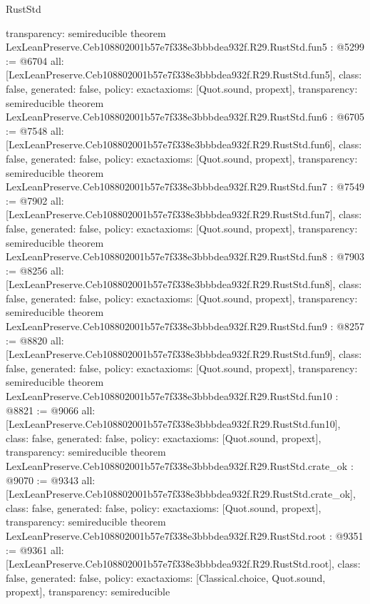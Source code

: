 \begin{lexlean}{RustStd}
\begin{coremodule}
{  transparency: semireducible
}
theorem LexLeanPreserve.Ceb108802001b57e7f338e3bbbdea932f.R29.RustStd.fun5 : @5299 := @6704 {
  all: [LexLeanPreserve.Ceb108802001b57e7f338e3bbbdea932f.R29.RustStd.fun5],
  class: false,
  generated: false,
  policy: exact{axioms: [Quot.sound, propext]},
  transparency: semireducible
}
theorem LexLeanPreserve.Ceb108802001b57e7f338e3bbbdea932f.R29.RustStd.fun6 : @6705 := @7548 {
  all: [LexLeanPreserve.Ceb108802001b57e7f338e3bbbdea932f.R29.RustStd.fun6],
  class: false,
  generated: false,
  policy: exact{axioms: [Quot.sound, propext]},
  transparency: semireducible
}
theorem LexLeanPreserve.Ceb108802001b57e7f338e3bbbdea932f.R29.RustStd.fun7 : @7549 := @7902 {
  all: [LexLeanPreserve.Ceb108802001b57e7f338e3bbbdea932f.R29.RustStd.fun7],
  class: false,
  generated: false,
  policy: exact{axioms: [Quot.sound, propext]},
  transparency: semireducible
}
theorem LexLeanPreserve.Ceb108802001b57e7f338e3bbbdea932f.R29.RustStd.fun8 : @7903 := @8256 {
  all: [LexLeanPreserve.Ceb108802001b57e7f338e3bbbdea932f.R29.RustStd.fun8],
  class: false,
  generated: false,
  policy: exact{axioms: [Quot.sound, propext]},
  transparency: semireducible
}
theorem LexLeanPreserve.Ceb108802001b57e7f338e3bbbdea932f.R29.RustStd.fun9 : @8257 := @8820 {
  all: [LexLeanPreserve.Ceb108802001b57e7f338e3bbbdea932f.R29.RustStd.fun9],
  class: false,
  generated: false,
  policy: exact{axioms: [Quot.sound, propext]},
  transparency: semireducible
}
theorem LexLeanPreserve.Ceb108802001b57e7f338e3bbbdea932f.R29.RustStd.fun10 : @8821 := @9066 {
  all: [LexLeanPreserve.Ceb108802001b57e7f338e3bbbdea932f.R29.RustStd.fun10],
  class: false,
  generated: false,
  policy: exact{axioms: [Quot.sound, propext]},
  transparency: semireducible
}
theorem LexLeanPreserve.Ceb108802001b57e7f338e3bbbdea932f.R29.RustStd.crate_ok : @9070 := @9343 {
  all: [LexLeanPreserve.Ceb108802001b57e7f338e3bbbdea932f.R29.RustStd.crate_ok],
  class: false,
  generated: false,
  policy: exact{axioms: [Quot.sound, propext]},
  transparency: semireducible
}
theorem LexLeanPreserve.Ceb108802001b57e7f338e3bbbdea932f.R29.RustStd.root : @9351 := @9361 {
  all: [LexLeanPreserve.Ceb108802001b57e7f338e3bbbdea932f.R29.RustStd.root],
  class: false,
  generated: false,
  policy: exact{axioms: [Classical.choice, Quot.sound, propext]},
  transparency: semireducible
}


\end{coremodule}
\end{lexlean}
